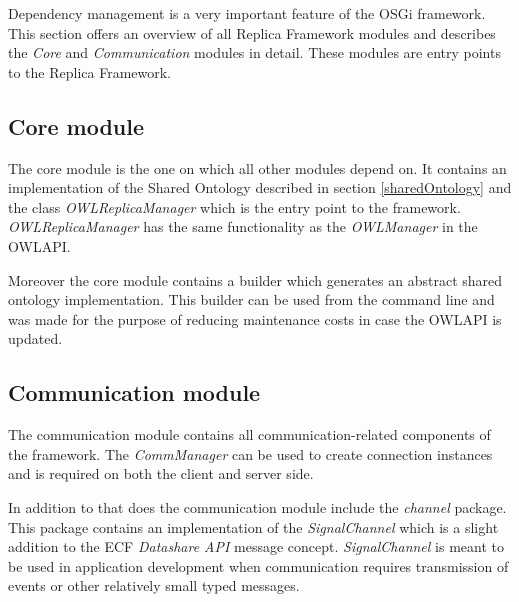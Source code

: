 Dependency management is a very important feature of the OSGi framework.
This section offers an overview of all Replica Framework modules and
describes the \emph{Core} and \emph{Communication} modules in detail. These modules are
entry points to the Replica Framework.

\subsection{Core module}
The core module is the one on which all other modules depend on.
It contains an implementation of the Shared Ontology described in section \ref{sharedOntology}
and the class \emph{OWLReplicaManager} which is the entry point to the framework.
\emph{OWLReplicaManager} has the same functionality as the \emph{OWLManager}
in the OWLAPI.

Moreover the core module contains a builder which generates an abstract shared ontology
implementation. This builder can be used from the command line and was made
for the purpose of reducing maintenance costs in case the OWLAPI is updated.

\subsection{Communication module}
\label{communicationmodule}
The communication module contains all communication-related components of
the framework. The \emph{CommManager} can be used to create connection instances
and is required on both the client and server side.

In addition to that does the communication module include the \emph{channel} package.
This package contains an implementation of the \emph{SignalChannel} which is a slight
addition to the ECF \emph{Datashare API} message concept. \emph{SignalChannel} is meant
to be used in application development when communication requires transmission
of events or other relatively small typed messages.


\newpage



